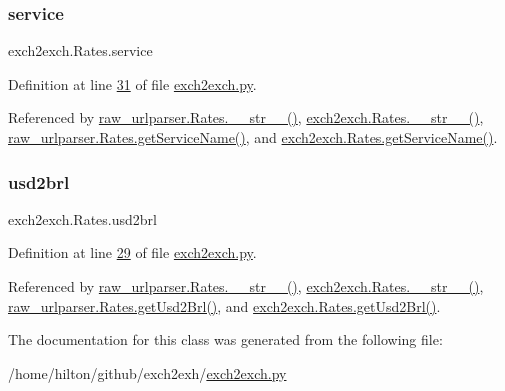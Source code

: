 \subsubsection{\texorpdfstring{service}{service}}
{\footnotesize\ttfamily exch2exch.\+Rates.\+service}



Definition at line \hyperlink{exch2exch_8py_source_l00031}{31} of file \hyperlink{exch2exch_8py_source}{exch2exch.\+py}.



Referenced by \hyperlink{raw__urlparser_8py_source_l00038}{raw\+\_\+urlparser.\+Rates.\+\_\+\+\_\+str\+\_\+\+\_\+()}, \hyperlink{exch2exch_8py_source_l00042}{exch2exch.\+Rates.\+\_\+\+\_\+str\+\_\+\+\_\+()}, \hyperlink{raw__urlparser_8py_source_l00035}{raw\+\_\+urlparser.\+Rates.\+get\+Service\+Name()}, and \hyperlink{exch2exch_8py_source_l00039}{exch2exch.\+Rates.\+get\+Service\+Name()}.

\mbox{\label{classexch2exch_1_1_rates_ab79ad6e4a42ca358e6b39c825a4b8a0b}} 
\subsubsection{\texorpdfstring{usd2brl}{usd2brl}}
{\footnotesize\ttfamily exch2exch.\+Rates.\+usd2brl}



Definition at line \hyperlink{exch2exch_8py_source_l00029}{29} of file \hyperlink{exch2exch_8py_source}{exch2exch.\+py}.



Referenced by \hyperlink{raw__urlparser_8py_source_l00038}{raw\+\_\+urlparser.\+Rates.\+\_\+\+\_\+str\+\_\+\+\_\+()}, \hyperlink{exch2exch_8py_source_l00042}{exch2exch.\+Rates.\+\_\+\+\_\+str\+\_\+\+\_\+()}, \hyperlink{raw__urlparser_8py_source_l00032}{raw\+\_\+urlparser.\+Rates.\+get\+Usd2\+Brl()}, and \hyperlink{exch2exch_8py_source_l00036}{exch2exch.\+Rates.\+get\+Usd2\+Brl()}.



The documentation for this class was generated from the following file\+:\begin{DoxyCompactItemize}
\item 
/home/hilton/github/exch2exh/\hyperlink{exch2exch_8py}{exch2exch.\+py}\end{DoxyCompactItemize}
